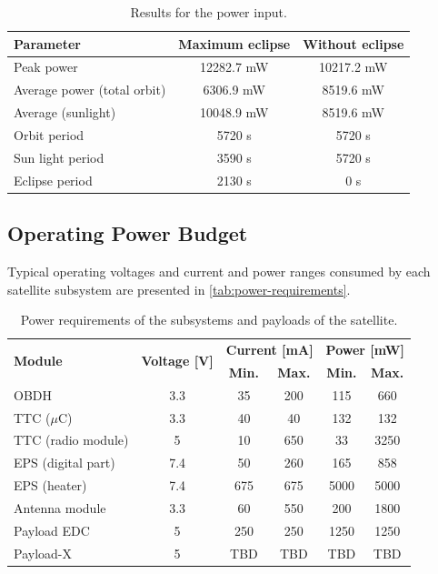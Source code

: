 \begin{table}[!htb]
    \centering
    \begin{tabular}{lcc}
        \toprule[1.5pt]
        \textbf{Parameter} & \textbf{Maximum eclipse} & \textbf{Without eclipse} \\    \midrule
        Peak power & 12282.7 mW & 10217.2 mW\\
        Average power (total orbit) & 6306.9 mW & 8519.6 mW \\
        Average (sunlight) & 10048.9 mW & 8519.6 mW\\
        Orbit period & 5720 s & 5720 s \\
        Sun light period &  3590 s & 5720 s\\
        Eclipse period & 2130 s & 0 s \\
        \bottomrule[1.5pt]
    \end{tabular}
    \caption{Results for the power input.}
    \label{tab:power-simulations}
\end{table}


\subsection{Operating Power Budget}

Typical operating voltages and current and power ranges consumed by each satellite subsystem are presented in \autoref{tab:power-requirements}.

\begin{table}[!h]
    \centering
    \begin{tabular}{lccccc}
        \toprule[1.5pt]
        \multirow{2}{*}{\textbf{Module}} & \multirow{2}{*}{\textbf{Voltage [V]}}    & \multicolumn{2}{c}{\textbf{Current [mA]}} & \multicolumn{2}{c}{\textbf{Power [mW]}} \\
                                         &                                          & \textbf{Min.} & \textbf{Max.}             & \textbf{Min.} & \textbf{Max.} \\
        \midrule
        OBDH                & 3.3   & 35    & 200   & 115   & 660 \\
        TTC ($\mu$C)        & 3.3   & 40    & 40    & 132   & 132 \\
        TTC (radio module)  & 5     & 10    & 650   & 33    & 3250 \\
        EPS (digital part)  & 7.4   & 50    & 260   & 165   & 858 \\
        EPS (heater)        & 7.4   & 675   & 675   & 5000  & 5000 \\
        Antenna module      & 3.3   & 60    & 550   & 200   & 1800 \\
        Payload EDC         & 5     & 250   & 250   & 1250  & 1250 \\
        Payload-X           & 5     & TBD   & TBD   & TBD   & TBD \\
        \bottomrule[1.5pt]
    \end{tabular}
    \caption{Power requirements of the subsystems and payloads of the satellite.}
    \label{tab:power-requirements}
\end{table}

